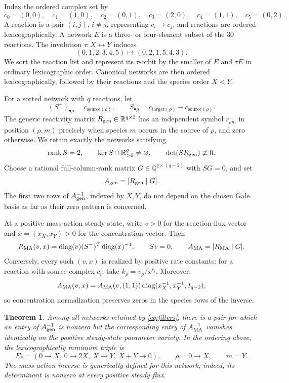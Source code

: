 \documentclass[11pt]{article}
\newtheorem{theorem}{Theorem}
\newcommand{\R}{\mathbb{R}}
\newcommand{\Q}{\mathbb{Q}}
\newcommand{\diag}{\operatorname{diag}}
\newcommand{\rank}{\operatorname{rank}}
\begin{document}
Index the ordered complex set by
\[
 c_0=(0,0),\quad c_1=(1,0),\quad c_2=(0,1),\quad
 c_3=(2,0),\quad c_4=(1,1),\quad c_5=(0,2).
\]
A reaction is a pair \((i,j)\), \(i\ne j\), representing
\(c_i\to c_j\), and reactions are ordered lexicographically.  A network
\(E\) is a three- or four-element subset of the 30 reactions.  The involution
\(\tau:X\leftrightarrow Y\) induces
\[
 (0,1,2,3,4,5)\longmapsto(0,2,1,5,4,3).
\]
We sort the reaction list and represent its \(\tau\)-orbit by the smaller of
\(E\) and \(\tau E\) in ordinary lexicographic order.  Canonical networks are
then ordered lexicographically, followed by their reactions and the species
order \(X<Y\).

For a sorted network with \(q\) reactions, let
\[
 (S^-)_{\bullet\rho}=c_{\mathrm{source}(\rho)},\qquad
 S_{\bullet\rho}=c_{\mathrm{target}(\rho)}-
 c_{\mathrm{source}(\rho)}.
\]
The generic reactivity matrix \(R_{\rm gen}\in\R^{q\times2}\) has an
independent symbol \(r_{\rho m}\) in position \((\rho,m)\) precisely when
species \(m\) occurs in the source of \(\rho\), and zero otherwise.  We retain
exactly the networks satisfying
\begin{equation}\label{eq:filters}
 \rank S=2,\qquad \ker S\cap\R_{>0}^{q}\ne\varnothing,
 \qquad \det(SR_{\rm gen})\not\equiv0.
\end{equation}
Choose a rational full-column-rank matrix
\(G\in\Q^{q\times(q-2)}\) with \(SG=0\), and set
\[
 A_{\rm gen}=[R_{\rm gen}\mid G].
\]
The first two rows of \(A_{\rm gen}^{-1}\), indexed by \(X,Y\), do not
depend on the chosen Gale basis as far as their zero pattern is concerned.

At a positive mass-action steady state, write \(v>0\) for the reaction-flux
vector and \(x=(x_X,x_Y)>0\) for the concentration vector.  Then
\begin{equation}\label{eq:ma}
 R_{\rm MA}(v,x)=\diag(v)(S^-)^T\diag(x)^{-1},
 \qquad Sv=0,
 \qquad A_{\rm MA}=[R_{\rm MA}\mid G].
\end{equation}
Conversely, every such \((v,x)\) is realized by positive rate constants:
for a reaction with source complex \(c_i\), take
\(k_\rho=v_\rho/x^{c_i}\).  Moreover,
\begin{equation}\label{eq:normalization}
 A_{\rm MA}(v,x)=A_{\rm MA}(v,(1,1))
 \diag(x_X^{-1},x_Y^{-1},I_{q-2}),
\end{equation}
so concentration normalization preserves zeros in the species rows of the
inverse.

\begin{theorem}\label{thm:main}
Among all networks retained by \eqref{eq:filters}, there is a pair for which
an entry of \(A_{\rm gen}^{-1}\) is nonzero but the corresponding entry of
\(A_{\rm MA}^{-1}\) vanishes identically on the positive steady-state
parameter variety.  In the ordering above, the lexicographically minimum
triple is
\[
 E_*=(0\to X,\ 0\to2X,\ X\to Y,\ X+Y\to0),
 \qquad \rho=0\to X,\qquad m=Y.
\]
The mass-action inverse is generically defined for this network; indeed, its
determinant is nonzero at every positive steady flux.
\end{theorem}
\end{document}
